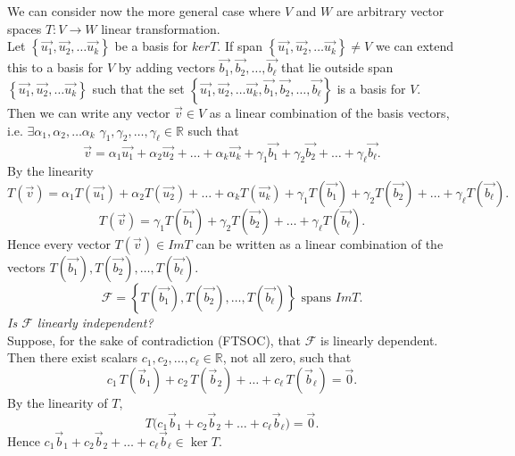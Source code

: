\documentclass{report}
\begin{document}
 We can consider now the more general case where $ V$ and $ W$ are arbitrary vector spaces $ T: V \to W$ linear transformation.\\
 Let $ \left\{ \vec{ u_1} , \vec{ u_2} , \ldots \vec{ u_k}  \right\}$ be a basis for $ ker T$. If span $ \left\{ \vec{ u_1} , \vec{ u_2} , \ldots \vec{ u_k}  \right\} \neq V $ we can extend this to a basis for $ V$ by adding vectors $ \vec{ b_1} , \vec{ b_2} , \ldots , \vec{ b_{\ell}}$ that lie outside span $ \left\{ \vec{ u_1} , \vec{ u_2} , \ldots \vec{ u_k}  \right\}$ such  that the set $ \left\{ \vec{ u_1} , \vec{ u_2} , \ldots \vec{ u_k} , \vec{ b_1} , \vec{ b_2} , \ldots , \vec{ b_{\ell}}  \right\}$ is a basis for $ V$.\\
 Then we can write any vector $ \vec{ v}  \in V$ as a linear combination of the basis vectors, i.e. $ \exists  \alpha _1, \alpha_2 , \ldots \alpha_k$ $ \gamma_1, \gamma_2, \ldots ,\gamma_{\ell} \in \mathbb{R}$ such that
 \[
 \vec{ v} = \alpha_1 \vec{ u_1} + \alpha_2 \vec{ u_2} + \ldots + \alpha_k \vec{ u_k} + \gamma_1 \vec{ b_1} + \gamma_2 \vec{ b_2} + \ldots + \gamma_{\ell} \vec{ b_{\ell}}
 .\] 
 By the linearity 
 \[
 T \left(  \vec{ v}  \right) = \alpha_1 T \left( \vec{ u_1}  \right) + \alpha_2 T \left( \vec{ u_2}  \right) + \ldots + \alpha_k T \left( \vec{ u_k}  \right) + \gamma_1 T \left( \vec{ b_1}  \right) + \gamma_2 T \left( \vec{ b_2}  \right) + \ldots + \gamma_{\ell} T \left( \vec{ b_{\ell}}  \right)
 .\] 
  \[
  T \left( \vec{ v}  \right) = \gamma_1 T \left( \vec{ b_1}  \right) + \gamma_2 T \left( \vec{ b_2}  \right) + \ldots + \gamma_{\ell} T \left( \vec{ b_{\ell}}  \right)
  .\] 
  Hence every vector $ T \left( \vec{ v}  \right) \in Im T$ can be written as a linear combination of the vectors $ T \left( \vec{ b_1}  \right) , T \left( \vec{ b_2}  \right) , \ldots , T \left( \vec{ b_{\ell}}  \right)$.\\
  \[
  \mathcal{F} = \left\{ T \left( \vec{ b_1}  \right) , T \left( \vec{ b_2}  \right) , \ldots , T \left( \vec{ b_{\ell}}  \right)  \right\} \text{ spans } Im T
  .\] 
\textit{Is \(\mathcal{F}\) linearly independent?}\\
Suppose, for the sake of contradiction (FTSOC), that \(\mathcal{F}\) is linearly dependent.  
Then there exist scalars \(c_1,c_2,\ldots,c_{\ell}\in\mathbb{R}\), not all zero, such that
\[
  c_1\,T(\vec b_1)+c_2\,T(\vec b_2)+\dots+c_{\ell}\,T(\vec b_{\ell})=\vec 0 .
\]
By the linearity of \(T\),
\[
  T\!\bigl(c_1\vec b_1+c_2\vec b_2+\dots+c_{\ell}\vec b_{\ell}\bigr)=\vec 0 .
\]
Hence \(c_1\vec b_1+c_2\vec b_2+\dots+c_{\ell}\vec b_{\ell}\in\ker T\).\\[6pt]
\end{document}

